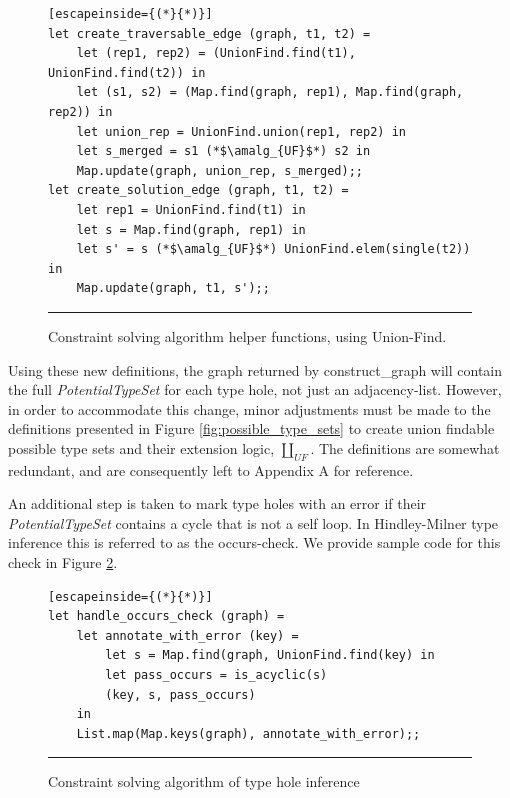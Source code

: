 \begin{figure}[htb!]
\begin{lstlisting}[escapeinside={(*}{*)}]
let create_traversable_edge (graph, t1, t2) =
    let (rep1, rep2) = (UnionFind.find(t1), UnionFind.find(t2)) in
    let (s1, s2) = (Map.find(graph, rep1), Map.find(graph, rep2)) in
    let union_rep = UnionFind.union(rep1, rep2) in
    let s_merged = s1 (*$\amalg_{UF}$*) s2 in
    Map.update(graph, union_rep, s_merged);;
let create_solution_edge (graph, t1, t2) =
    let rep1 = UnionFind.find(t1) in
    let s = Map.find(graph, rep1) in
    let s' = s (*$\amalg_{UF}$*) UnionFind.elem(single(t2)) in
    Map.update(graph, t1, s');;
\end{lstlisting}
\vspace{-2px}
\hrule
\caption{Constraint solving algorithm helper functions, using Union-Find.}
\label{fig:algcode_construct_graph_helpers}
\end{figure}

Using these new definitions, the graph returned by construct\_graph will contain the full \textit{PotentialTypeSet} for each type hole, not just an adjacency-list. However, in order to accommodate this change, minor adjustments must be made to the definitions presented in Figure \ref{fig:possible_type_sets} to create union findable possible type sets and their extension logic, $\amalg_{UF}$. The definitions are somewhat redundant, and are consequently left to Appendix A for reference. 

An additional step is taken to mark type holes with an error if their \emph{PotentialTypeSet} contains a cycle that is not a self loop. In Hindley-Milner type inference this is referred to as the occurs-check. We provide sample code for this check in Figure \ref{fig:occurs_check}.

\begin{figure}[htb!]
\begin{lstlisting}[escapeinside={(*}{*)}]
let handle_occurs_check (graph) =
    let annotate_with_error (key) =
        let s = Map.find(graph, UnionFind.find(key) in
        let pass_occurs = is_acyclic(s)
        (key, s, pass_occurs)
    in
    List.map(Map.keys(graph), annotate_with_error);;
\end{lstlisting}
\vspace{-4px}
 \hrule
\caption{Constraint solving algorithm of type hole inference}
\label{fig:occurs_check}
\end{figure}

